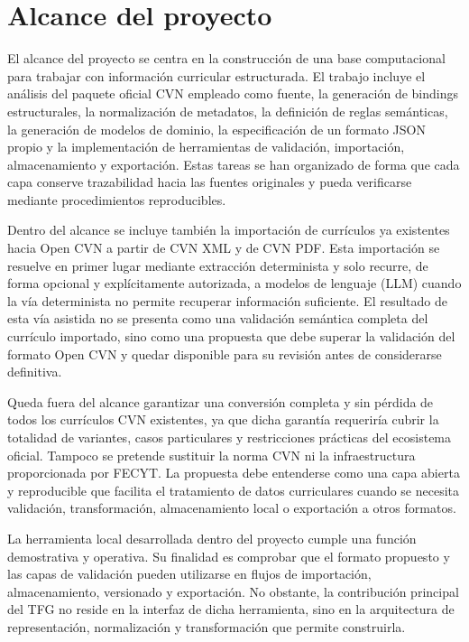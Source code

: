 \section{Alcance del proyecto}
\label{sec:introduccion_alcance}

El alcance del proyecto se centra en la construcción de una base computacional
para trabajar con información curricular estructurada. El trabajo incluye el
análisis del paquete oficial CVN empleado como fuente, la generación de bindings
estructurales, la normalización de metadatos, la definición de reglas semánticas,
la generación de modelos de dominio, la especificación de un formato JSON propio y
la implementación de herramientas de validación, importación, almacenamiento y
exportación. Estas tareas se han organizado de forma que cada capa conserve
trazabilidad hacia las fuentes originales y pueda verificarse mediante
procedimientos reproducibles.

Dentro del alcance se incluye también la importación de currículos ya existentes
hacia Open CVN a partir de CVN XML y de CVN PDF. Esta importación se resuelve en
primer lugar mediante extracción determinista y solo recurre, de forma opcional y
explícitamente autorizada, a modelos de lenguaje (LLM) cuando la vía determinista
no permite recuperar información suficiente. El resultado de esta vía asistida no
se presenta como una validación semántica completa del currículo importado, sino
como una propuesta que debe superar la validación del formato Open CVN y quedar
disponible para su revisión antes de considerarse definitiva.

Queda fuera del alcance garantizar una conversión completa y sin pérdida de todos
los currículos CVN existentes, ya que dicha garantía requeriría cubrir la totalidad
de variantes, casos particulares y restricciones prácticas del ecosistema oficial.
Tampoco se pretende sustituir la norma CVN ni la infraestructura proporcionada por
FECYT. La propuesta debe entenderse como una capa abierta y reproducible que
facilita el tratamiento de datos curriculares cuando se necesita validación,
transformación, almacenamiento local o exportación a otros formatos.

La herramienta local desarrollada dentro del proyecto cumple una función
demostrativa y operativa. Su finalidad es comprobar que el formato propuesto y las
capas de validación pueden utilizarse en flujos de importación, almacenamiento,
versionado y exportación. No obstante, la contribución principal del TFG no reside
en la interfaz de dicha herramienta, sino en la arquitectura de representación,
normalización y transformación que permite construirla.

